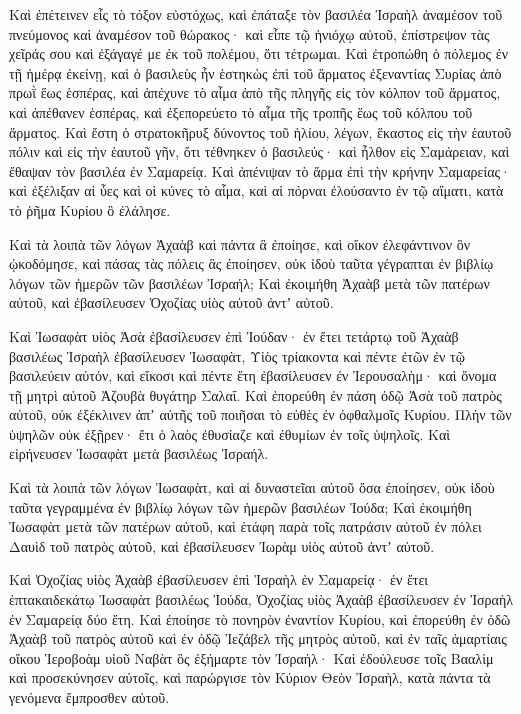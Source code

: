 {\par }{\PP {}Καὶ ἐπέτεινεν εἷς τὸ τόξον εὐστόχως, καὶ ἐπάταξε τὸν βασιλέα Ἰσραὴλ ἀναμέσον τοῦ πνεύμονος καὶ ἀναμέσον τοῦ θώρακος· καὶ εἶπε τῷ ἡνιόχῳ αὐτοῦ, ἐπίστρεψον τὰς χεῖράς σου καὶ ἐξάγαγέ με ἐκ τοῦ πολέμου, ὅτι τέτρωμαι.
Καὶ ἐτροπώθη ὁ πόλεμος ἐν τῇ ἡμέρᾳ ἐκείνῃ, καὶ ὁ βασιλεὺς ἦν ἑστηκὼς ἐπὶ τοῦ ἅρματος ἐξεναντίας Συρίας ἀπὸ πρωῒ ἕως ἑσπέρας, καὶ ἀπέχυνε τὸ αἷμα ἀπὸ τῆς πληγῆς εἰς τὸν κόλπον τοῦ ἅρματος, καὶ ἀπέθανεν ἑσπέρας, καὶ ἐξεπορεύετο τὸ αἷμα τῆς τροπῆς ἕως τοῦ κόλπου τοῦ ἅρματος.
Καὶ ἔστη ὁ στρατοκῆρυξ δύνοντος τοῦ ἡλίου, λέγων, ἕκαστος εἰς τὴν ἑαυτοῦ πόλιν καὶ εἰς τὴν ἑαυτοῦ γῆν,
ὅτι τέθνηκεν ὁ βασιλεύς· καὶ ἦλθον εἰς Σαμάρειαν, καὶ ἔθαψαν τὸν βασιλέα ἐν Σαμαρείᾳ.
Καὶ ἀπένιψαν τὸ ἅρμα ἐπὶ τὴν κρήνην Σαμαρείας· καὶ ἐξέλιξαν αἱ ὗες καὶ οἱ κύνες τὸ αἷμα, καὶ αἱ πόρναι ἐλούσαντο ἐν τῷ αἵματι, κατὰ τὸ ῥῆμα Κυρίου ὃ ἐλάλησε.
\par }{\PP {}Καὶ τὰ λοιπὰ τῶν λόγων Ἀχαὰβ καὶ πάντα ἃ ἐποίησε, καὶ οἴκον ἐλεφάντινον ὃν ᾠκοδόμησε, καὶ πάσας τὰς πόλεις ἃς ἐποίησεν, οὐκ ἰδοὺ ταῦτα γέγραπται ἐν βιβλίῳ λόγων τῶν ἡμερῶν τῶν βασιλέων Ἰσραήλ;
Καὶ ἐκοιμήθη Ἀχαὰβ μετὰ τῶν πατέρων αὐτοῦ, καὶ ἐβασίλευσεν Ὀχοζίας υἱὸς αὐτοῦ ἀντʼ αὐτοῦ.
\par }{\PP {}Καὶ Ἰωσαφὰτ υἱὸς Ἀσὰ ἐβασίλευσεν ἐπὶ Ἰούδαν· ἐν ἔτει τετάρτῳ τοῦ Ἀχαὰβ βασιλέως Ἰσραὴλ ἐβασίλευσεν
Ἰωσαφὰτ, Υἱὸς τρίακοντα καὶ πέντε ἐτῶν ἐν τῷ βασιλεύειν αὐτόν, καὶ εἴκοσι καὶ πέντε ἔτη ἐβασίλευσεν ἐν Ἰερουσαλὴμ· καὶ ὄνομα τῇ μητρὶ αὐτοῦ Ἀζουβὰ θυγάτηρ Σαλαΐ.
Καὶ ἐπορεύθη ἐν πάση ὁδῷ Ἀσὰ τοῦ πατρὸς αὐτοῦ, οὐκ ἐξέκλινεν ἀπʼ αὐτῆς τοῦ ποιῆσαι τὸ εὐθὲς ἐν ὀφθαλμοῖς Κυρίου.
Πλὴν τῶν ὑψηλῶν οὐκ ἐξῇρεν· ἔτι ὁ λαὸς ἐθυσίαζε καὶ ἐθυμίων ἐν τοῖς ὑψηλοῖς.
Καὶ εἰρήνευσεν Ἰωσαφὰτ μετὰ βασιλέως Ἰσραήλ.
\par }{\PP {}Καὶ τὰ λοιπὰ τῶν λόγων Ἰωσαφὰτ, καὶ αἱ δυναστεῖαι αὐτοῦ ὅσα ἐποίησεν, οὐκ ἰδοὺ ταῦτα γεγραμμένα ἐν βιβλίῳ λόγων τῶν ἡμερῶν βασιλέων Ἰούδα;
Καὶ ἐκοιμήθη Ἰωσαφὰτ μετὰ τῶν πατέρων αὐτοῦ, καὶ ἐτάφη παρὰ τοῖς πατράσιν αὐτοῦ ἐν πόλει Δαυὶδ τοῦ πατρὸς αὐτοῦ, καὶ ἐβασίλευσεν Ἰωρὰμ υἱὸς αὐτοῦ ἀντʼ αὐτοῦ.
\par }{\PP {}Καὶ Ὀχοζίας υἱὸς Ἀχαὰβ ἐβασίλευσεν ἐπὶ Ἰσραὴλ ἐν Σαμαρείᾳ· ἐν ἔτει ἑπτακαιδεκάτῳ Ἰωσαφὰτ βασιλέως Ἰούδα, Ὀχοζίας υἱὸς Ἀχαὰβ ἐβασίλευσεν ἐν Ἰσραὴλ ἐν Σαμαρείᾳ δύο ἔτη.
Καὶ ἐποίησε τὸ πονηρὸν ἐναντίον Κυρίου, καὶ ἐπορεύθη ἐν ὁδῶ Ἀχαὰβ τοῦ πατρὸς αὐτοῦ καὶ ἐν ὁδῷ Ἰεζάβελ τῆς μητρὸς αὐτοῦ, καὶ ἐν ταῖς ἁμαρτίαις οἴκου Ἱεροβοὰμ υἱοῦ Ναβὰτ ὃς ἐξήμαρτε τὸν Ἰσραήλ·
Καὶ ἐδούλευσε τοῖς Βααλὶμ καὶ προσεκύνησεν αὐτοῖς, καὶ παρώργισε τὸν Κύριον Θεὸν Ἰσραὴλ, κατὰ πάντα τὰ γενόμενα ἔμπροσθεν αὐτοῦ.
\par }